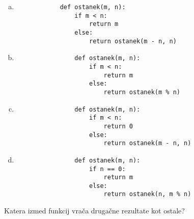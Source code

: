 \documentclass[arhiv, 10pt]{../izpit}
\begin{document}
        \begin{multicols}{2}
        \begin{enumerate}[(a)]
\item 
            \begin{verbatim}
            def ostanek(m, n):
                if m < n:
                    return m
                else:
                    return ostanek(m - n, n)
            \end{verbatim}
        
\item 
                \begin{verbatim}
                def ostanek(m, n):
                    if m < n:
                        return m
                    else:
                        return ostanek(m % n)
                \end{verbatim}
            
\item 
                \begin{verbatim}
                def ostanek(m, n):
                    if m < n:
                        return 0
                    else:
                        return ostanek(m - n, n)
                \end{verbatim}
            
\item 
                \begin{verbatim}
                def ostanek(m, n):
                    if n == 0:
                        return m
                    else:
                        return ostanek(n, m % n)
                \end{verbatim}
            
\end{enumerate}

        \end{multicols}
    
        \naloga*
        
        Katera izmed funkcij vrača drugačne rezultate kot ostale?
    
\end{document}
